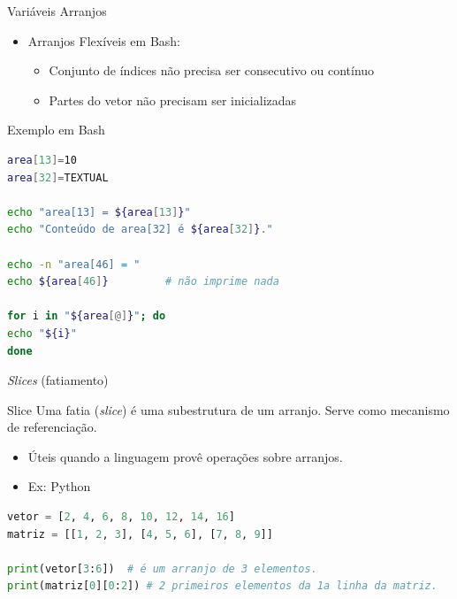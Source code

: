 \documentclass[handout]{beamer}
\begin{document}
\begin{frame}[fragile]{Variáveis Arranjos}
\begin{itemize}
\item Arranjos Flexíveis em Bash:
\begin{itemize}
\item Conjunto de índices não precisa ser consecutivo ou contínuo
\item Partes do vetor não precisam ser inicializadas
\end{itemize}
\end{itemize}

\begin{block}{Exemplo em Bash}
\begin{lstlisting}[language=Bash,numbers=none, basicstyle=\tiny]
area[13]=10
area[32]=TEXTUAL

echo "area[13] = ${area[13]}"
echo "Conteúdo de area[32] é ${area[32]}."

echo -n "area[46] = "
echo ${area[46]}         # não imprime nada

for i in "${area[@]}"; do
echo "${i}"
done
\end{lstlisting}
\end{block}
\end{frame}



\begin{frame}[fragile]{\textit{Slices} (fatiamento)}

\begin{block}{Slice}
    Uma fatia (\textit{slice}) é uma subestrutura de um arranjo. Serve como mecanismo de referenciação.
\end{block}

\begin{itemize}
    \item Úteis quando a linguagem provê operações sobre arranjos.
    \item Ex: Python
\end{itemize}
\begin{lstlisting}[language=Python,numbers=none]
vetor = [2, 4, 6, 8, 10, 12, 14, 16]
matriz = [[1, 2, 3], [4, 5, 6], [7, 8, 9]]

print(vetor[3:6])  # é um arranjo de 3 elementos.
print(matriz[0][0:2]) # 2 primeiros elementos da 1a linha da matriz.
\end{lstlisting}
\end{frame}
\end{document}
